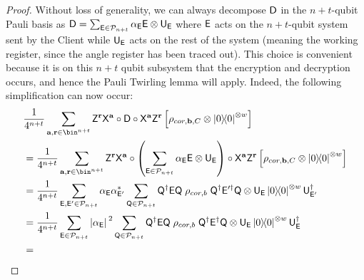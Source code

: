 \begin{proof}
        Without loss of generality, we can always decompose $\mathsf{D}$ in the $n+t$-qubit Pauli basis as $\mathsf{D}=\sum_{\mathsf{E}\in\mathcal{P}_{n+t}}\alpha_{\mathsf{E}} \mathsf{E}\otimes \mathsf{U}_{\mathsf{E}}$ where $\mathsf{E}$ acts on the $n+t$-qubit system sent by the Client while $\mathsf{U}_{\mathsf{E}}$ acts on the rest of the system (meaning the working register, since the angle register has been traced out). This choice is convenient because it is on this $n+t$ qubit subsystem that the encryption and decryption occurs, and hence the Pauli Twirling lemma will apply. Indeed, the following simplification can now occur:
        \begin{align}
            \label{eq:twirl begin}
            &\dfrac{1}{4^{n+t}}\sum_{\a, \r\in\bin^{n+t}}
                \Dec{\a}{\r}
                \circ
                \D
                \circ
                \Enc{\a}{\r}
                \left[
                    \rho_{cor, \b, C}
                \otimes
                \ketbra{0}^{\otimes w}
                \right]
                \\
                &=
            \dfrac{1}{4^{n+t}}\sum_{\a, \r\in\bin^{n+t}}
                \Dec{\a}{\r}
                \circ
                \left(
                    \sum_{\E\in\Pauli_{n+t}}\alpha_\E \E\otimes \U_\E
                 \right)
                \circ
                \Enc{\a}{\r}
                \left[
                    \rho_{cor, \b, C}
                \otimes
                \ketbra{0}^{\otimes w}
                \right]
                \\
                &=
                \dfrac{1}{4^{n+t}}\sum_{\E, \E'\in \Pauli_{n+t}}
                \alpha_\E
                \alpha^*_{\E'}
                \sum_{\Q \in \Pauli_{n+t}}
                \Q^\dagger
                \E
                \Q
                \;
                \rho_{cor, b}
                \;
                \Q^\dagger
                \E^{\prime \dagger}
                \Q
                \otimes \U_{\E}\ketbra0^{\otimes w}\U^\dagger_{\E'}
                \\
                &=
                \dfrac{1}{4^{n+t}}\sum_{\E\in \Pauli_{n+t}}
                \abs*{\alpha_\E}^2
                \sum_{\Q \in \Pauli_{n+t}}
                \Q^\dagger
                \E
                \Q
                \;
                \rho_{cor, b}
                \;
                \Q^\dagger
                \E^{\dagger}
                \Q
                \otimes \U_{\E}\ketbra0^{\otimes w}\U^\dagger_{\E}
                \\
                \label{eq:twirl end}
                &=

\end{align}
\end{proof}
